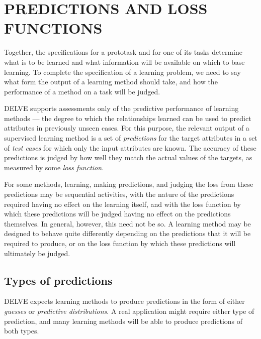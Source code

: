 %
%
\newpage

\section{PREDICTIONS AND LOSS FUNCTIONS}\label{sec-loss}
\thispagestyle{plain}
\setcounter{figure}{0}

Together, the specifications for a prototask and for one of its tasks
determine what is to be learned and what information will be available
on which to base learning.  To complete the specification of a
learning problem, we need to say what form the output of a learning
method should take, and how the performance of a method on a task will
be judged.

DELVE supports assessments only of the predictive performance of
learning methods --- the degree to which the relationships learned
can be used to predict attributes in previously unseen cases.  For
this purpose, the relevant output of a supervised learning method
is a set of {\em predictions\/} for the target attributes in a set of
{\em test cases\/} for which only the input attributes are known.  The
accuracy of these predictions is judged by how well they match the
actual values of the targets, as measured by some {\em loss function}.

For some methods, learning, making predictions, and judging the
loss from these predictions may be sequential activities, with the
nature of the predictions required having no effect on the learning
itself, and with the loss function by which these predictions will be
judged having no effect on the predictions themselves.  In general,
however, this need not be so.  A learning method may be designed to
behave quite differently depending on the predictions that it will be
required to produce, or on the loss function by which these
predictions will ultimately be judged.


\subsection{Types of predictions}\label{loss-pred}

DELVE expects learning methods to produce predictions in the form
of either {\em guesses\/} or {\em predictive distributions}.  A real
application might require either type of prediction, and many learning
methods will be able to produce predictions of both types.


